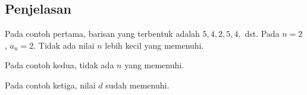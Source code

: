 \documentclass{article}
\begin{document}
\subsection*{Penjelasan}

\par\noindent Pada contoh pertama, barisan yang terbentuk adalah $5, 4, 2, 5, 4,$ dst. Pada $n = 2$, $a_n = 2$. Tidak ada nilai $n$ lebih kecil yang memenuhi.

\par\noindent Pada contoh kedua, tidak ada $n$ yang memenuhi.

\par\noindent Pada contoh ketiga, nilai $d$ sudah memenuhi.
\end{document}
